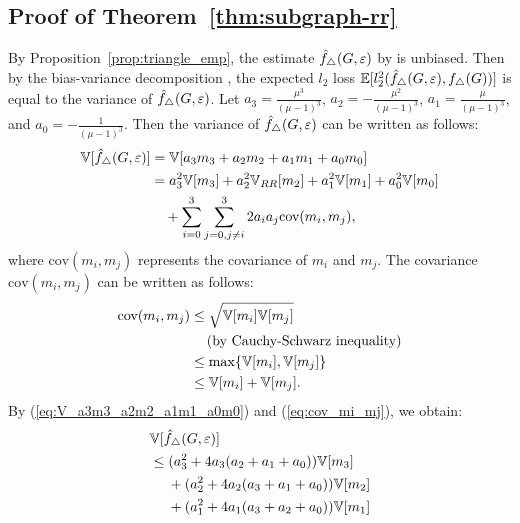 {\subsection{Proof of Theorem~\ref{thm:subgraph-rr}}
\label{sub:proof_thm:subgraph-rr}
By Proposition~\ref{prop:triangle_emp}, the estimate $\hat{f}_{\triangle}(G, \varepsilon)$ by  is unbiased. 
Then by the bias-variance decomposition \cite{mlpp}, 
the expected $l_2$ loss $\mathbb{E}[l_2^2(\hat{f}_{\triangle}(G, \varepsilon), f_\triangle(G))]$ is equal to the variance of $\hat{f}_{\triangle}(G, \varepsilon)$. 
Let 
$a_3 = \frac{\mu^3}{(\mu-1)^3}$, 
$a_2 = - \frac{\mu^2}{(\mu-1)^3}$, 
$a_1 = \frac{\mu}{(\mu-1)^3}$, and 
$a_0 = - \frac{1}{(\mu-1)^3}$. 
Then the variance of $\hat{f}_{\triangle}(G, \varepsilon)$ can be written as follows:
\begin{align}
    \mathbb{V}[\hat{f}_{\triangle}(G, \varepsilon)] 
    &= \mathbb{V}[a_3 m_3 + a_2 m_2 + a_1 m_1 + a_0 m_0] \nonumber\\
    &= a_3^2 \mathbb{V}[m_3] + a_2^2 \mathbb{V}_{RR}[m_2] + a_1^2 \mathbb{V}[m_1] + a_0^2 \mathbb{V}[m_0] \nonumber\\
    &\hspace{3.5mm} + \sum_{i=0}^3 \sum_{j=0, j \ne i}^3 2a_i a_j \text{cov}(m_i, m_j),
    \label{eq:V_a3m3_a2m2_a1m1_a0m0}
\end{align}
where $\text{cov}(m_i, m_j)$ represents the covariance of $m_i$ and $m_j$. 
The covariance $\text{cov}(m_i, m_j)$ can be written as follows:
\begin{align}
    \text{cov}(m_i, m_j)
    &\leq \sqrt{\mathbb{V}[m_i] \mathbb{V}[m_j]} \nonumber\\
    &\hspace{4.2mm} (\text{by Cauchy-Schwarz inequality}) \nonumber\\
    &\leq  \max\{ \mathbb{V}[m_i], \mathbb{V}[m_j]\} \nonumber\\
    &\leq \mathbb{V}[m_i] + \mathbb{V}[m_j].
    \label{eq:cov_mi_mj}
\end{align}
By (\ref{eq:V_a3m3_a2m2_a1m1_a0m0}) and (\ref{eq:cov_mi_mj}), we obtain:
\begin{align}
    &\V[\hf_{\triangle}(G, \epsilon)] \nonumber\\
    &\leq (a_3^2 + 4a_3(a_2 + a_1 + a_0)) \V[m_3] \nonumber\\
    & \hspace{4.5mm} + (a_2^2 + 4a_2(a_3 + a_1 + a_0)) \V[m_2] \nonumber\\
    & \hspace{4.5mm} + (a_1^2 + 4a_1(a_3 + a_2 + a_0)) \V[m_1] \nonumber\\

\end{align}}
